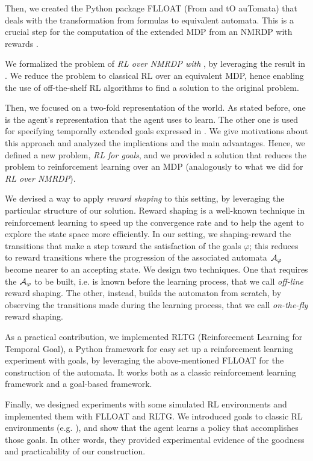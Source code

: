 Then, we created the  Python package FLLOAT (From \LTLf and \LDLf tO auTomata) that deals with the transformation from \LLf formulas to equivalent automata. This is a crucial step for the computation of the extended MDP from an NMRDP with \LLf rewards \citep{AAAI1817342}.

We formalized the problem of \emph{RL over NMRDP with \LLf}, by leveraging the result in \citep{AAAI1817342}. We reduce the problem to classical RL over an equivalent MDP, hence enabling the use of off-the-shelf RL algorithms to find a solution to the original problem.

Then, we focused on a two-fold representation of the world. As stated before, one is the agent's representation that the agent uses to learn. The other one is used for specifying temporally extended goals expressed in \LLf. We give motivations about this approach and analyzed the implications and the main advantages. Hence, we defined a new problem, \emph{RL for \LLf goals}, and we provided a solution that reduces the problem to reinforcement learning over an MDP (analogously to what we did for \emph{RL over NMRDP}).

We devised a way to apply \emph{reward shaping} to this setting, by leveraging the particular structure of our solution. Reward shaping is a well-known technique in reinforcement learning to speed up the convergence rate and to help the agent to explore the state space more efficiently. In our setting, we shaping-reward the transitions that make a step toward the satisfaction of the \LLf goals $\varphi$; this reduces to reward transitions where the progression of the associated automata $\mathcal{A}_{\varphi}$ become nearer to an accepting state. We design two techniques. One that requires the $\mathcal{A}_{\varphi}$ to be built, i.e. is known before the learning process, that we call \emph{off-line} reward shaping. The other, instead, builds the automaton from scratch, by observing the transitions made during the learning process, that we call \emph{on-the-fly} reward shaping.

As a practical contribution, we implemented RLTG (Reinforcement Learning for Temporal Goal), a Python framework for easy set up a reinforcement learning experiment with \LLf goals, by leveraging the above-mentioned FLLOAT for the construction of the automata. It works both as a classic reinforcement learning framework and a \LLf goal-based framework. 

Finally, we designed experiments with some simulated RL environments and implemented them with FLLOAT and RLTG. We introduced \LLf goals to classic RL environments (e.g. \Breakout), and show that the agent learns a policy that accomplishes those goals.
In other words, they provided experimental evidence of the goodness and practicability of our construction.


